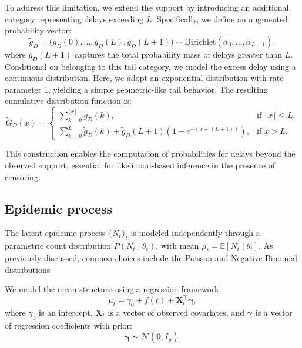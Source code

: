 \documentclass[12pt]{article}
\begin{document}
To address this limitation, we extend the support by introducing an additional category representing delays exceeding $L$. Specifically, we define an augmented probability vector:
\begin{equation}
    \tilde{g}_D = \big(g_D(0), \dots, g_D(L), g_D(L+1)\big) \sim \text{Dirichlet}(\alpha_0, \dots, \alpha_{L+1}),
\end{equation}
where $g_D(L+1)$ captures the total probability mass of delays greater than $L$. Conditional on belonging to this tail category, we model the excess delay using a continuous distribution. Here, we adopt an exponential distribution with rate parameter 1, yielding a simple geometric-like tail behavior. The resulting cumulative distribution function is:
\begin{equation}
    \tilde{G}_D(x) =
    \begin{cases}
        \sum_{k=0}^{\lfloor x \rfloor} \tilde{g}_D(k), & \text{if } \lfloor x \rfloor \leq L, \\
        \sum_{k=0}^{L} \tilde{g}_D(k) + \tilde{g}_D(L+1)\left(1 - e^{-(x - (L+1))}\right), & \text{if } x > L.
    \end{cases}
\end{equation}

This construction enables the computation of probabilities for delays beyond the observed support, essential for likelihood-based inference in the presence of censoring.

\subsection{Epidemic process}

The latent epidemic process $\{N_t\}_t$ is modeled independently through a parametric count distribution $P(N_t \mid \theta_t)$, with mean $\mu_t = \mathbb{E}[N_t \mid \theta_t]$. As previously discussed, common choices include the Poisson and Negative Binomial distributions

We model the mean structure using a regression framework:
\begin{equation}
\mu_t = \gamma_0 + f(t) + \mathbf{X}_t^\top \boldsymbol{\gamma},
\end{equation}
where $\gamma_0$ is an intercept, $\mathbf{X}_t$ is a vector of observed covariates, and $\boldsymbol{\gamma}$ is a vector of regression coefficients with prior:
\begin{equation}
\boldsymbol{\gamma} \sim \mathcal{N}(\mathbf{0}, I_p).
\end{equation}
\end{document}

